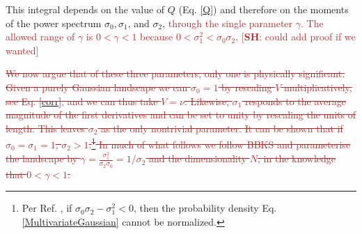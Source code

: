 \documentclass[12pt]{article}
\newcommand{\re}[1]{\textcolor{blue}{[{\bf RE}: #1]}}
\newcommand{\lfl}[1]{\textcolor{red}{[{\bf LL}: #1]}}
\newcommand{\SH}[1]{\textcolor{brown}{[{\bf SH}: #1]}}
\newcommand{\sh}[1]{\textcolor{brown}{#1}}
\begin{document}
This integral depends on the value of $Q$ (Eq. \ref{Q}) and therefore on the moments of the power spectrum $\sigma_0, \sigma_1$,  and $\sigma_2$, \sh{through the single parameter $\gamma$. The allowed range of $\gamma$ is $0<\gamma<1$ because $0<\sigma_1^2<\sigma_0\sigma_2$}. \SH{could add proof if we wanted}

\sh{\sout{We now argue that of these three parameters, only one is physically significant. Given a purely Gaussian landscape we can $\sigma_0=1$ by rescaling $V$ multiplicatively, see Eq. \ref{corr}, and we can thus take $V = \nu$. Likewise, $\sigma_1$ responds to the average magnitude of the first derivatives and can be set to unity by rescaling the units of length. This leaves $\sigma_2$ as the only nontrivial parameter. It can be shown that if $\sigma_0=\sigma_1=1$, $\sigma_2>1$.\footnote{Per Ref. \cite{Yamada2018}, if $\sigma_0\sigma_2 - \sigma_1^2 < 0$, then the probability density Eq. \ref{MultivariateGaussian} cannot be normalized.} In much of what follows we follow BBKS and parameterise the landscape by $\gamma = \frac{\sigma_1^2}{\sigma_2 \sigma_0}=1/\sigma_2$ and the dimensionality $N$,  in the knowledge that $0<\gamma<1$.}}



\end{document}
